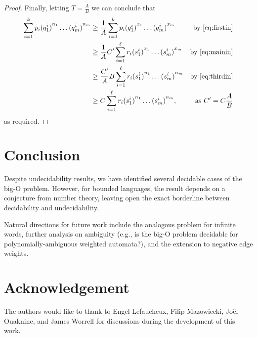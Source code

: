 \documentclass[10pt,a4paper]{amsart}
\numberwithin{equation}{section}
\theoremstyle{plain}
\theoremstyle{definition}
\theoremstyle{remark}
\begin{document}
\begin{proof}
Finally, letting $T=\frac{A}{B}$ we can conclude that
\begin{align*}
 \sum_{i=1}^{k} p_i{({q}^i_1)}^{n_1}\dots {({q}^i_m)}^{n_m} &\ge
\frac{1}{A}\sum_{i=1}^{k} p_i{({q}^i_1)}^{x_1}\dots {({q}^i_m)}^{x_m}
&\text{by \cref{eq:firstin}}
\\ & \ge\frac{1}{A}  C'\sum_{i=1}^{\ell} r_i{({s}^i_1)}^{x_1}\dots {({s}^i_m)}^{x_m}
&\text{by \cref{eq:mainin}}
\\ & \ge  \frac{ C'}{A}B \sum_{i=1}^{\ell} r_i{({s}^i_1)}^{n_1}\dots {({s}^i_m)}^{n_m}&\text{by \cref{eq:thirdin}}
\\ & \ge C \sum_{i=1}^{\ell} r_i{({s}^i_1)}^{n_1}\dots {({s}^i_m)}^{n_m},&\text{as $C' = C\frac{A}{B}$}
\end{align*}
as required.
\end{proof}

\section{Conclusion}
Despite undecidability results, we have identified several decidable cases of the big-O problem.
However, for  bounded languages, the result depends on a conjecture from number theory, leaving open the exact borderline between decidability
and undecidability.

Natural directions for future work include the analogous problem for infinite words, further analysis on ambiguity (e.g., is the big-O problem decidable for polynomially-ambiguous weighted automata?), and the extension to negative edge weights.

\section*{Acknowledgement}

The authors would like to thank to Engel Lefaucheux, Filip Mazowiecki, Jo\"el Ouaknine, and James Worrell for discussions during the development of this work.

 
\end{document}
